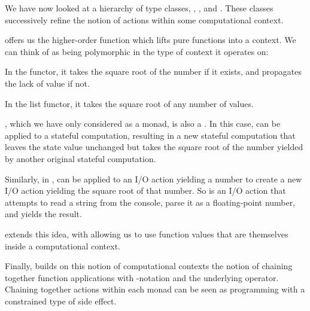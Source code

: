 We have now looked at a hierarchy of type classes, , , and . 
These classes successively refine the notion of actions within some computational context.

 offers us the higher-order function  which lifts pure functions into a 
context. We can think of  as being polymorphic in the type of context it operates on:

\begin{notelist}
    \item In the  functor, it takes the square root of the number if it exists, and propagates
          the lack of value if not.
    \item In the list functor, it takes the square root of any number of values.
    \item {}, which we have only considered as a monad, is also a . In this case,
           can be applied to a stateful computation, resulting in a new stateful computation
          that leaves the state value unchanged but takes the square root of the number yielded by
          another original stateful computation.
    \item Similarly, in ,  can be applied to an I/O action yielding a number to create
          a new I/O action yielding the square root of that number. So  is an 
          I/O action that attempts to read a string from the console, parse it as a floating-point number,
          and yields the result.
\end{notelist}

 extends this idea, with \code{(<*>)} allowing us to use function values that are
themselves inside a computational context. 

Finally,  builds on this notion of computational contexts the notion of chaining together
function applications with -notation and the underlying \code{(>>=)} operator. Chaining together
actions within each monad can be seen as programming with a constrained type of side effect.

